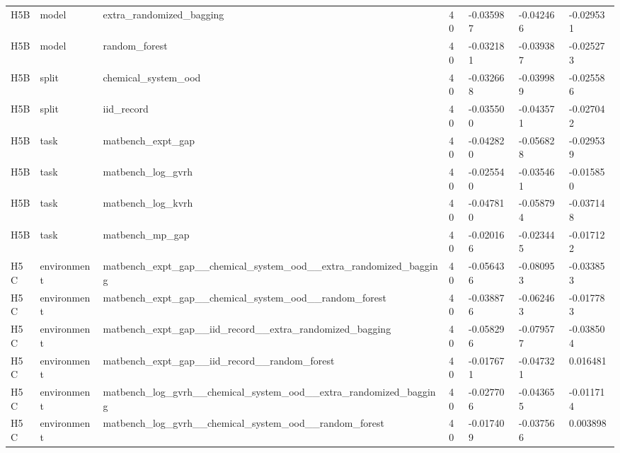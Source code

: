 \documentclass[10pt]{article}
\begin{document}
\begin{landscape}
\begin{longtable}{L{.35in}L{.6in}L{3.55in}L{.4in}L{.88in}L{.88in}L{.88in}}
H5B & model & extra\_\allowbreak{}randomized\_\allowbreak{}bagging & 40 & -0.035987 & -0.042466 & -0.029531\\
H5B & model & random\_\allowbreak{}forest & 40 & -0.032181 & -0.039387 & -0.025273\\
H5B & split & chemical\_\allowbreak{}system\_\allowbreak{}ood & 40 & -0.032668 & -0.039989 & -0.025586\\
H5B & split & iid\_\allowbreak{}record & 40 & -0.035500 & -0.043571 & -0.027042\\
H5B & task & matbench\_\allowbreak{}expt\_\allowbreak{}gap & 40 & -0.042820 & -0.056828 & -0.029539\\
H5B & task & matbench\_\allowbreak{}log\_\allowbreak{}gvrh & 40 & -0.025540 & -0.035461 & -0.015850\\
H5B & task & matbench\_\allowbreak{}log\_\allowbreak{}kvrh & 40 & -0.047810 & -0.058794 & -0.037148\\
H5B & task & matbench\_\allowbreak{}mp\_\allowbreak{}gap & 40 & -0.020166 & -0.023445 & -0.017122\\
H5C & environment & matbench\_\allowbreak{}expt\_\allowbreak{}gap\_\allowbreak{}\_\allowbreak{}chemical\_\allowbreak{}system\_\allowbreak{}ood\_\allowbreak{}\_\allowbreak{}extra\_\allowbreak{}randomized\_\allowbreak{}bagging & 40 & -0.056436 & -0.080953 & -0.033853\\
H5C & environment & matbench\_\allowbreak{}expt\_\allowbreak{}gap\_\allowbreak{}\_\allowbreak{}chemical\_\allowbreak{}system\_\allowbreak{}ood\_\allowbreak{}\_\allowbreak{}random\_\allowbreak{}forest & 40 & -0.038876 & -0.062463 & -0.017783\\
H5C & environment & matbench\_\allowbreak{}expt\_\allowbreak{}gap\_\allowbreak{}\_\allowbreak{}iid\_\allowbreak{}record\_\allowbreak{}\_\allowbreak{}extra\_\allowbreak{}randomized\_\allowbreak{}bagging & 40 & -0.058296 & -0.079577 & -0.038504\\
H5C & environment & matbench\_\allowbreak{}expt\_\allowbreak{}gap\_\allowbreak{}\_\allowbreak{}iid\_\allowbreak{}record\_\allowbreak{}\_\allowbreak{}random\_\allowbreak{}forest & 40 & -0.017671 & -0.047321 & 0.016481\\
H5C & environment & matbench\_\allowbreak{}log\_\allowbreak{}gvrh\_\allowbreak{}\_\allowbreak{}chemical\_\allowbreak{}system\_\allowbreak{}ood\_\allowbreak{}\_\allowbreak{}extra\_\allowbreak{}randomized\_\allowbreak{}bagging & 40 & -0.027706 & -0.043655 & -0.011714\\
H5C & environment & matbench\_\allowbreak{}log\_\allowbreak{}gvrh\_\allowbreak{}\_\allowbreak{}chemical\_\allowbreak{}system\_\allowbreak{}ood\_\allowbreak{}\_\allowbreak{}random\_\allowbreak{}forest & 40 & -0.017409 & -0.037566 & 0.003898\\

\end{longtable}
\end{landscape}
\end{document}
